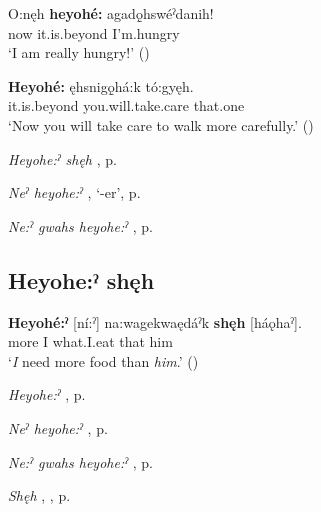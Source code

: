 \ea
\label{ex:hpar15}
\gll O:nęh \textbf{heyohé:} agadǫ̱hswéˀdanih!\\
now it.is.beyond I’m.hungry\\
\glt ‘I am really hungry!’ (\cite{carrier_legends_2013})
\z

\ea
\label{ex:hpar16}
\gll \textbf{Heyohé:} ęhsnigǫ̱há:k tó:gyęh.\\
it.is.beyond you.will.take.care that.one\\
\glt ‘Now you will take care to walk more carefully.’ (\cite{henry_de_2005})
\z

\begin{CayugaRelated}
\item \textit{Heyohe:ˀ shęh} , p. \pageref{p:[heyohe:ˀ shęh]}\\
\item \textit{Neˀ heyohe:ˀ} , ‘-er’, p. \pageref{p:[neˀ heyohe:ˀ]}\\
\item \textit{Ne:ˀ gwahs heyohe:ˀ} , p. \pageref{p:[ne:ˀ gwahs heyohe:ˀ]}
\end{CayugaRelated}

\subsection*{\textbf{Heyohe:ˀ shęh} } \label{p:[heyohe:ˀ shęh]}

\ea
\label{ex:hpar17}
\gll \textbf{Heyohé:ˀ} [ní:ˀ] na:wagekwaędáˀk \textbf{shęh} [háǫhaˀ].\\
more I what.I.eat that him\\
\glt ‘\emph{I} need more food than \emph{him}.’ (\cite{carrier_legends_2013})
\z

\begin{CayugaRelated}
\item \textit{Heyohe:ˀ} , p. \pageref{p:[heyohe:ˀ]}\\
\item \textit{Neˀ heyohe:ˀ} , p. \pageref{p:[neˀ heyohe:ˀ]}\\
\item \textit{Ne:ˀ gwahs heyohe:ˀ} , p. \pageref{p:[ne:ˀ gwahs heyohe:ˀ]}\\
\item \textit{Shęh} , , p. \pageref{p:[shęh] `because’}
\end{CayugaRelated}

